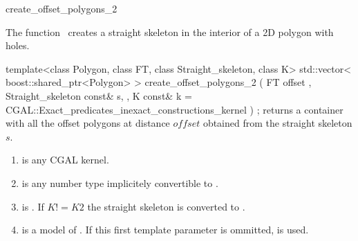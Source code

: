 

\begin{ccRefFunction}{create_offset_polygons_2}


\ccDefinition

The function \ccRefName\ creates a straight skeleton in the interior of a 2D polygon with holes.


\ccFunction
{template<class Polygon, class FT, class Straight_skeleton, class K>
std::vector< boost::shared_ptr<Polygon> >
create_offset_polygons_2 ( FT                       offset
                         , Straight_skeleton const& s,
                         , K const&                 k = CGAL::Exact_predicates_inexact_constructions_kernel
                         ) ;
}
{returns a container with all the offset polygons at distance $offset$ obtained from 
the straight skeleton $s$. 
}


\begin{enumerate}  
   \item    {} is any CGAL kernel.
   \item    {} is any number type implicitely convertible to .
   \item    {} is . 
            If $K != K2$ the straight skeleton is converted to .
   \item    {} is a model of . 
            If this first template parameter is ommitted,  is used.
\end{enumerate}


\ccSeeAlso
{}\\
\\
\\
\\

\end{ccRefFunction}


